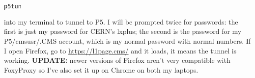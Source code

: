 \begin{lstlisting}[belowskip=-0.7cm, language=sh, numbers=none]
p5tun
\end{lstlisting}

into my terminal to tunnel to P5. I will be prompted twice for passwords: the first is just my password for CERN's lxplus; the second is the password for my P5/cmsusr/.CMS account, which is my normal password with normal numbers. If I open Firefox, go to \url{https://l1page.cms/} and it loads, it means the tunnel is working. \textbf{UPDATE:} newer versions of Firefox aren't very compatible with FoxyProxy so I've also set it up on Chrome on both my laptops.

